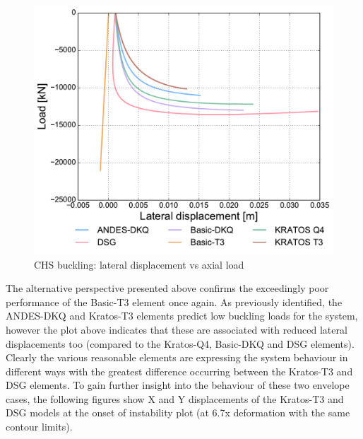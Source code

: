 \begin{figure}[H]
	\centering
	\def\svgwidth{\columnwidth}
	\includegraphics[width=12cm]{images/stability_chs_trans_disp.pdf}
	\caption{CHS buckling: lateral displacement vs axial load}
	\label{pic:eulerchs2}
\end{figure}

The alternative perspective presented above confirms the exceedingly poor performance of the Basic-T3 element once again. As previously identified, the ANDES-DKQ and Kratos-T3 elements predict low buckling loads for the system, however the plot above indicates that these are associated with reduced lateral displacements too (compared to the Kratos-Q4, Basic-DKQ and DSG elements). Clearly the various reasonable elements are expressing the system behaviour in different ways with the greatest difference occurring between the Kratos-T3 and DSG elements. To gain further insight into the behaviour of these two envelope cases, the following figures show X and Y displacements of the Kratos-T3 and DSG models at the onset of instability plot (at 6.7x deformation with the same contour limits).

